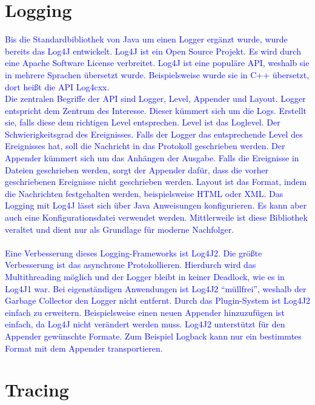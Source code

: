 \section{Logging}\label{sec:logging-verfahren}

\textcolor{blue}{
    Bis die Standardbibliothek von Java um einen Logger ergänzt wurde, wurde bereits das Log4J entwickelt.
    Log4J ist ein Open Source Projekt.
    Es wird durch eine Apache Software License verbreitet.
    Log4J ist eine populäre API, weshalb sie in mehrere Sprachen übersetzt wurde.
    Beispielsweise wurde sie in C++ übersetzt, dort heißt die API Log4cxx.
    \\
    Die zentralen Begriffe der API sind Logger, Level, Appender und Layout.
    Logger entspricht dem Zentrum des Interesse.
    Dieser kümmert sich um die Logs.
    Erstellt sie, falls diese dem richtigen Level entsprechen.
    Level ist das Loglevel.
    Der Schwierigkeitsgrad des Ereignisses.
    Falls der Logger das entsprechende Level des Ereignisses hat, soll die Nachricht in das Protokoll geschrieben werden.
    Der Appender kümmert sich um das Anhängen der Ausgabe.
    Falls die Ereignisse in Dateien geschrieben werden, sorgt der Appender dafür, dass die vorher geschriebenen Ereignisse nicht geschrieben werden.
    Layout ist das Format, indem die Nachrichten festgehalten werden, beispielsweise HTML oder XML.
    Das Logging mit Log4J lässt sich über Java Anweisungen konfigurieren.
    Es kann aber auch eine Konfigurationsdatei verwendet werden.
    Mittlerweile ist diese Bibliothek veraltet und dient nur als Grundlage für moderne Nachfolger.
    \\
    \\
    Eine Verbesserung dieses Logging-Frameworks ist Log4J2.
    Die größte Verbesserung ist das asynchrone Protokollieren.
    Hierdurch wird das Multithreading möglich und der Logger bleibt in keiner Deadlock, wie es in Log4J1 war.
    Bei eigenständigen Anwendungen ist Log4J2 \enquote{müllfrei}, weshalb der Garbage Collector den Logger nicht entfernt.
    Durch das Plugin-System ist Log4J2 einfach zu erweitern.
    Beispielsweise einen neuen Appender hinzuzufügen ist einfach, da Log4J nicht verändert werden muss.
    Log4J2 unterstützt für den Appender gewünschte Formate.
    Zum Beispiel Logback kann nur ein bestimmtes Format mit dem Appender transportieren.
}\autocite{rheinwerk, baeldung, log4j2}


\section{Tracing}\label{sec:tracing-verfahren}

